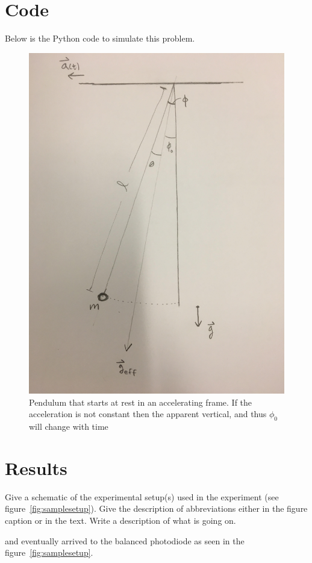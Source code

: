 \documentclass[12pt]{article}
\begin{document}
\clearpage

\section{Code}
Below is the Python code to simulate this problem. 

\begin{figure}[!h]
	\centering
	\includegraphics[width=.8\textwidth]{pendulum.jpg}
	\caption{Pendulum that starts at rest in an accelerating frame. If the acceleration is not constant then the apparent vertical, and thus $\phi_0$ will change with time}
\end{figure}

\section{Results}


Give a schematic of the experimental setup(s) used in the experiment (see
figure~\ref{fig:samplesetup}). Give the description of  abbreviations
either in the figure caption or in the text. Write a description of what is
going on.


and eventually arrived to the
balanced photodiode as seen in the figure~\ref{fig:samplesetup}.
\end{document}
